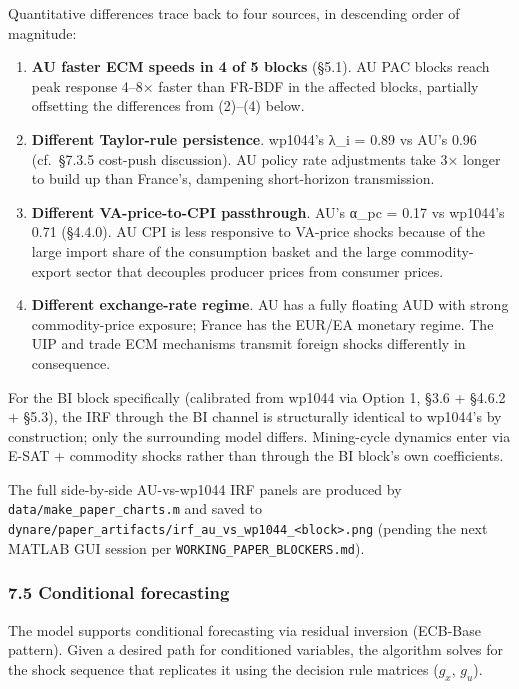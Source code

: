 \documentclass[
]{article}
\providecommand{\tightlist}{%
  \setlength{\itemsep}{0pt}\setlength{\parskip}{0pt}}
\begin{document}
Quantitative differences trace back to four sources, in descending order
of magnitude:

\begin{enumerate}
\def\labelenumi{\arabic{enumi}.}
\tightlist
\item
  \textbf{AU faster ECM speeds in 4 of 5 blocks} (§5.1). AU PAC blocks
  reach peak response 4--8× faster than FR-BDF in the affected blocks,
  partially offsetting the differences from (2)--(4) below.
\item
  \textbf{Different Taylor-rule persistence}. wp1044's λ\_i = 0.89 vs
  AU's 0.96 (cf.~§7.3.5 cost-push discussion). AU policy rate
  adjustments take 3× longer to build up than France's, dampening
  short-horizon transmission.
\item
  \textbf{Different VA-price-to-CPI passthrough}. AU's α\_pc = 0.17 vs
  wp1044's 0.71 (§4.4.0). AU CPI is less responsive to VA-price shocks
  because of the large import share of the consumption basket and the
  large commodity-export sector that decouples producer prices from
  consumer prices.
\item
  \textbf{Different exchange-rate regime}. AU has a fully floating AUD
  with strong commodity-price exposure; France has the EUR/EA monetary
  regime. The UIP and trade ECM mechanisms transmit foreign shocks
  differently in consequence.
\end{enumerate}

For the BI block specifically (calibrated from wp1044 via Option 1, §3.6
+ §4.6.2 + §5.3), the IRF through the BI channel is structurally
identical to wp1044's by construction; only the surrounding model
differs. Mining-cycle dynamics enter via E-SAT + commodity shocks rather
than through the BI block's own coefficients.

The full side-by-side AU-vs-wp1044 IRF panels are produced by
\texttt{data/make\_paper\_charts.m} and saved to
\texttt{dynare/paper\_artifacts/irf\_au\_vs\_wp1044\_\textless{}block\textgreater{}.png}
(pending the next MATLAB GUI session per
\texttt{WORKING\_PAPER\_BLOCKERS.md}).

\subsubsection{7.5 Conditional
forecasting}\label{conditional-forecasting}

The model supports conditional forecasting via residual inversion
(ECB-Base pattern). Given a desired path for conditioned variables, the
algorithm solves for the shock sequence that replicates it using the
decision rule matrices (\(g_x\), \(g_u\)).
\end{document}
